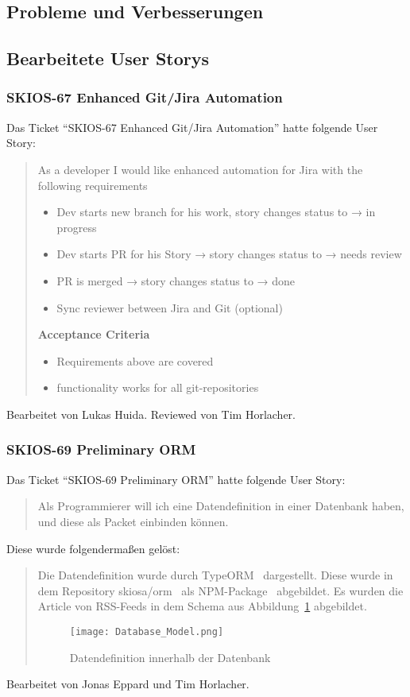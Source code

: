 \subsection{Probleme und Verbesserungen}

\subsection{Bearbeitete User Storys}

\subsubsection{SKIOS-67 Enhanced Git/Jira Automation}
Das Ticket \enquote{SKIOS-67 Enhanced Git/Jira Automation} hatte folgende User Story:
\begin{quotation}
    As a developer I would like enhanced automation for Jira with the following requirements
    \begin{itemize}
        \item Dev starts new branch for his work, story changes status to → in progress
        \item Dev starts PR for his Story → story changes status to → needs review
        \item PR is merged → story changes status to → done
        \item Sync reviewer between Jira and Git (optional) 
    \end{itemize}

    \textbf{Acceptance Criteria}
    \begin{itemize}
        \item Requirements above are covered
        \item functionality works for all git-repositories
    \end{itemize}
\end{quotation}
Bearbeitet von Lukas Huida.
Reviewed von Tim Horlacher.

\subsubsection{SKIOS-69 Preliminary ORM}
Das Ticket \enquote{SKIOS-69 Preliminary ORM} hatte folgende User Story:
\begin{quotation}
    Als Programmierer will ich eine Datendefinition in einer Datenbank
    haben, und diese als Packet einbinden können.
\end{quotation}
Diese wurde folgendermaßen gelöst:
\begin{quotation}
Die Datendefinition wurde durch TypeORM~\parencite{web/TypeORM} dargestellt.
Diese wurde in dem Repository skiosa/orm~\parencite{git/skiosa/orm} als NPM-Package~\parencite{web/npm} abgebildet.
Es wurden die Article von RSS-Feeds in dem Schema aus Abbildung~\ref{fig:databaseORM} abgebildet.
\begin{figure}
    \texttt{[image: Database\_Model.png]}
    \caption{Datendefinition innerhalb der Datenbank}
    \label{fig:databaseORM}
\end{figure}
\end{quotation}
Bearbeitet von Jonas Eppard und Tim Horlacher.

